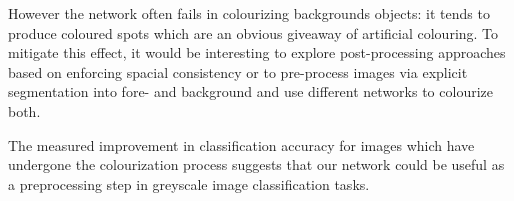 \documentclass{article}
\begin{document}
However the network often fails in colourizing backgrounds objects: it tends to
produce coloured spots which are an obvious giveaway of
artificial colouring. To mitigate this effect, it would be interesting to
explore post-processing approaches based on enforcing spacial consistency
or to pre-process images via explicit segmentation into fore- and background
and use different networks to colourize both.

The measured improvement in classification accuracy for images which have
undergone the colourization process suggests that our network could be useful
as a preprocessing step in greyscale image classification tasks.

\small


\end{document}
